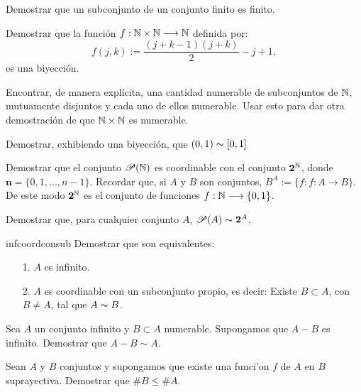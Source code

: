 \begin{ejercicio}{1.5} Demostrar que un subconjunto de un conjunto
finito es finito.
\end{ejercicio}
\begin{ejercicio}{2} Demostrar que la función
$f:\mathbb{N}\times\mathbb{N}\longrightarrow\mathbb{N}$ definida por:
\[f(j,k):=\frac{(j+k-1)(j+k)}{2}-j+1,\]
es una biyección.
\end{ejercicio}

\begin{ejercicio}{} Encontrar, de manera explícita, una cantidad numerable de subconjuntos
de $\mathbb{N}$, mutuamente disjuntos y cada uno de ellos 
numerable. Usar esto para dar otra demostración de que $\mathbb{N}\times\mathbb{N}$ es
numerable.
\end{ejercicio}

\begin{ejercicio}{5} Demostrar, exhibiendo una biyección, que $(0,1)\thicksim [0,1]$
\end{ejercicio}
\begin{ejercicio}{6} Demostrar que el conjunto
$\mathscr{P}(\mathbb{N})$ es coordinable con el conjunto
$\mathbf{2}^{\mathbb{N}}$, donde $\mathbf{n}=\{0,1,...,n-1\}$. Recordar
que, si $A$ y $B$ son conjuntos, $B^A:=\{f:f:A\longrightarrow
B\}$. De este modo $\mathbf{2}^{\mathbb{N}}$ es el conjunto de funciones
$f:\mathbb{N}\longrightarrow \{0,1\}$.
\end{ejercicio}

\begin{ejercicio}{8} Demostrar que, para cualquier conjunto
$A$, $\mathscr{P}(A)\thicksim\mathbf{2}^A$.
\end{ejercicio}
\begin{ejercicio}{infcoordconsub} Demostrar que son
equivalentes:
\begin{itemize}
     \item[1.] $A$ es infinito.
     \item[2.] $A$ es coordinable con un subconjunto propio, es
     decir: Existe $B\subset A$, con $B\neq A$, tal que
     $A\thicksim B$.
\end{itemize}
\end{ejercicio}

\begin{ejercicio}{} Sea $A$ un conjunto infinito y $B\subset A$ 
 numerable. Supongamos que $A-B$ es infinito. Demostrar que
$A-B\sim A$.
\end{ejercicio}




\begin{ejercicio}{} Sean $A$ y $B$ conjuntos y supongamos que existe
una funci'on  $f$ de $A$ en $B$ suprayectiva. Demostrar que $\#
B\leq \#A$.
\end{ejercicio}

